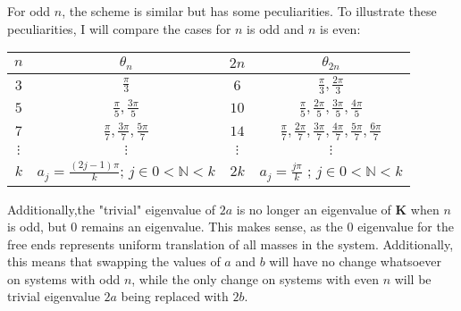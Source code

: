 \documentclass[11pt]{article}
\begin{document}
For odd $n$, the scheme is similar but has some peculiarities. To illustrate these peculiarities, I will compare the cases for $n$ is odd and $n$ is even:

\begin{center}
	\begin{tabular}{ c | c || c | c}
		$n$  & $\theta_n$ & $2n$ & $\theta_{2n}$\\
		\hline
		$3$ & $\frac{\pi}{3}$ & $6$ & $\frac{\pi}{3}, \frac{2 \pi}{3}$ \\
		$5$ & $\frac{\pi}{5}, \frac{3\pi}{5}$ & $10$ & $\frac{\pi}{5}, \frac{2\pi}{5}, \frac{3\pi}{5},\frac{4\pi}{5}$\\
		$7$ & $\frac{\pi}{7}, \frac{3\pi}{7},\frac{5\pi}{7}$ & $14$ &$\frac{\pi}{7}, \frac{2\pi}{7}, \frac{3\pi}{7}, \frac{4\pi}{7}, \frac{5\pi}{7}, \frac{6\pi}{7}$\\
		$\vdots$ & $\vdots$ & $\vdots$ & $\vdots$\\
		$k$ & $a_j = \frac{(2j-1)\pi}{k}$; $j \in 0<\mathbb{N} < k$ & $2k$ & $a_j = \frac{j \pi}{k}$ ; $j \in 0<\mathbb{N} < k$
	\end{tabular}
\end{center}

Additionally,the "trivial" eigenvalue of $2a$ is no longer an eigenvalue of $\mathbf{K}$ when $n$ is odd, but $0$ remains an eigenvalue. This makes sense, as the $0$ eigenvalue for the free ends represents uniform translation of all masses in the system. Additionally, this means that swapping the values of $a$ and $b$ will have no change whatsoever on systems with odd $n$, while the only change on systems with even $n$ will be trivial eigenvalue $2a$ being replaced with $2b$. 
\end{document}
